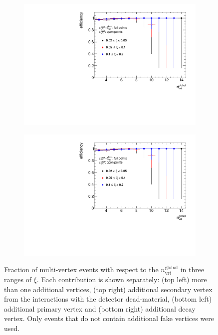 \begin{figure}[b!]
\begin{subfigure}{.49\textwidth}
		\includegraphics[width=\textwidth,page=6]{chapters/chrgSTAR/img/vertex/vertexEffi_ksi_noFake.pdf}
	\end{subfigure}
	\begin{subfigure}{.49\textwidth}
		\includegraphics[width=\textwidth,page=7]{chapters/chrgSTAR/img/vertex/vertexEffi_ksi_noFake.pdf}
	\end{subfigure}
	\caption{Fraction of multi-vertex events  with respect to the $n_\textrm{vrt}^\textrm{global}$ in three ranges of $\xi$. Each contribution is shown separately: (top left) more than one additional vertices, (top right) additional secondary vertex from the interactions with the detector dead-material, (bottom left) additional primary vertex and (bottom right)  additional decay vertex. Only events that do not contain additional fake vertices were used.}
	\label{fig:vertexVeto_noFake}
\end{figure}

